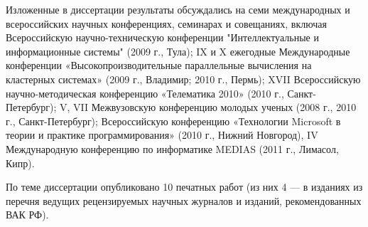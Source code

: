 Изложенные в диссертации результаты обсуждались на семи международных и всероссийских научных конференциях, семинарах и совещаниях, включая Всероссийскую научно-техническую конференции "Интеллектуальные и информационные системы" (2009 г., Тула); IX и X ежегодные Международные конференции «Высокопроизводительные параллельные вычисления на кластерных системах» (2009 г., Владимир; 2010 г., Пермь); XVII Всероссийскую научно-методическая конференцию «Телематика 2010» (2010 г., Санкт-Петербург); V, VII Межвузовскую конференцию молодых ученых (2008 г., 2010 г., Санкт-Петербург); Всероссийскую конференцию «Технологии Microsoft в теории и практике программирования» (2010 г., Нижний Новгород), IV Международную конференцию по информатике MEDIAS (2011 г., Лимасол, Кипр).

 По теме диссертации опубликовано 10 печатных работ (из них 4 — в изданиях из перечня ведущих рецензируемых научных журналов и изданий, рекомендованных ВАК РФ).

